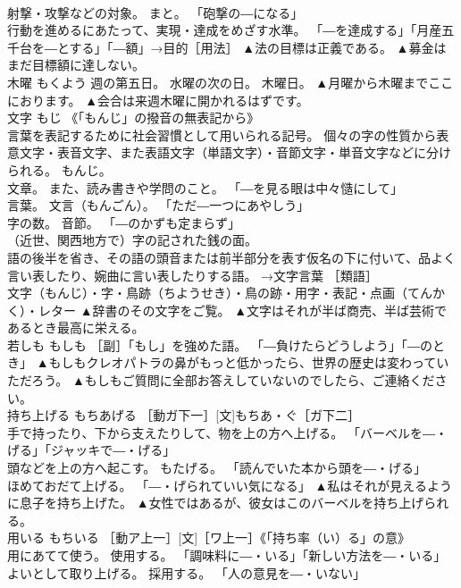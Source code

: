 \documentclass[8pt]{extreport}
\begin{document}
\begin{CJK}{UTF8}{min}
\\	射撃・攻撃などの対象。 まと。 「砲撃の―になる」 
\\	行動を進めるにあたって、実現・達成をめざす水準。 「―を達成する」「月産五千台を―とする」「―額」→目的［用法］	▲法の目標は正義である。 ▲募金はまだ目標額に達しない。
\\	木曜	もくよう	週の第五日。 水曜の次の日。 木曜日。	▲月曜から木曜までここにおります。 ▲会合は来週木曜に開かれるはずです。
\\	文字	もじ	《「もんじ」の撥音の無表記から》 
\\	言葉を表記するために社会習慣として用いられる記号。 個々の字の性質から表意文字・表音文字、また表語文字（単語文字）・音節文字・単音文字などに分けられる。 もんじ。 
\\	文章。 また、読み書きや学問のこと。 「―を見る眼は中々慥にして」 
\\	言葉。 文言（もんごん）。 「ただ―一つにあやしう」 
\\	字の数。 音節。 「―のかずも定まらず」 
\\	（近世、関西地方で）字の記された銭の面。 
\\	語の後半を省き、その語の頭音または前半部分を表す仮名の下に付いて、品よく言い表したり、婉曲に言い表したりする語。 →文字言葉 ［類語］
\\	文字（もんじ）・字・鳥跡（ちようせき）・鳥の跡・用字・表記・点画（てんかく）・レター	▲辞書のその文字をご覧。 ▲文字はそれが半ば商売、半ば芸術であるとき最高に栄える。
\\	若しも	もしも	［副］「もし」を強めた語。 「―負けたらどうしよう」「―のとき」	▲もしもクレオパトラの鼻がもっと低かったら、世界の歴史は変わっていただろう。 ▲もしもご質問に全部お答えしていないのでしたら、ご連絡ください。
\\	持ち上げる	もちあげる	［動ガ下一］[文]もちあ・ぐ［ガ下二］ 
\\	手で持ったり、下から支えたりして、物を上の方へ上げる。 「バーベルを―・げる」「ジャッキで―・げる」 
\\	頭などを上の方へ起こす。 もたげる。 「読んでいた本から頭を―・げる」 
\\	ほめておだて上げる。 「―・げられていい気になる」	▲私はそれが見えるように息子を持ち上げた。 ▲女性ではあるが、彼女はこのバーベルを持ち上げられる。
\\	用いる	もちいる	［動ア上一］[文]［ワ上一］《「持ち率（い）る」の意》 
\\	用にあてて使う。 使用する。 「調味料に―・いる」「新しい方法を―・いる」 
\\	よいとして取り上げる。 採用する。 「人の意見を―・いない」 

\end{CJK}
\end{document}
